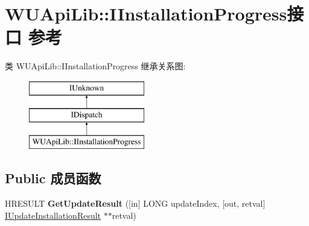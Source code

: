 \hypertarget{interface_w_u_api_lib_1_1_i_installation_progress}{}\section{W\+U\+Api\+Lib\+:\+:I\+Installation\+Progress接口 参考}
\label{interface_w_u_api_lib_1_1_i_installation_progress}
类 W\+U\+Api\+Lib\+:\+:I\+Installation\+Progress 继承关系图\+:\begin{figure}[H]
\begin{center}
\leavevmode
\includegraphics[height=3.000000cm]{interface_w_u_api_lib_1_1_i_installation_progress}
\end{center}
\end{figure}
\subsection*{Public 成员函数}
\begin{DoxyCompactItemize}
\item 
\mbox{\label{interface_w_u_api_lib_1_1_i_installation_progress_a8a749238a33e8136226ce9a45a73450c}} 
H\+R\+E\+S\+U\+LT {\bfseries Get\+Update\+Result} (\mbox{[}in\mbox{]} L\+O\+NG update\+Index, \mbox{[}out, retval\mbox{]} \hyperlink{interface_w_u_api_lib_1_1_i_update_installation_result}{I\+Update\+Installation\+Result} $\ast$$\ast$retval)
\end{DoxyCompactItemize}
